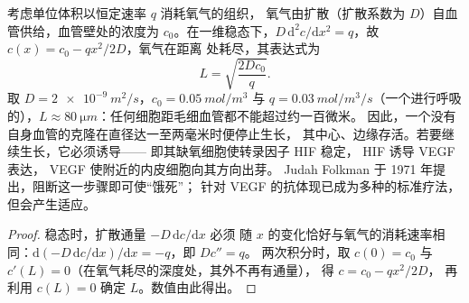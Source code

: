 \begin{proposition}[氧气决定无血管肿瘤的大小]\label{prop:b3:cancer-biology:oxygen}
考虑单位体积以恒定速率 $q$ 消耗氧气的组织，
氧气由扩散（扩散系数为 $D$）自血管供给，血管壁处的浓度为
$c_{0}$。在一维稳态下，$D\,
\mathrm{d}^{2}c/\mathrm{d}x^{2} = q$，故 $c(x) = c_{0} - qx^{2}/2D$，氧气在距离
处耗尽，其表达式为
\[
L = \sqrt{\frac{2Dc_{0}}{q}} .
\]
取 $D = \qty{2e-9}{m^2/s}$，$c_{0} = \qty{0.05}{mol/m^3}$ 与 $q =
\qty{0.03}{mol/m^3/s}$（一个进行呼吸的），$L \approx \qty{80}{\micro
m}$：任何细胞距毛细血管都不能超过约一百微米。
因此，一个没有自身血管的克隆在直径达一至两毫米时便停止生长，
其中心、边缘存活。若要继续生长，它必须诱导\emph{}——
即其缺氧细胞使转录因子 HIF 稳定，
HIF 诱导 VEGF 表达，
VEGF 使附近的内皮细胞向其方向出芽。
Judah Folkman 于 1971 年提出，阻断这一步骤即可使“饿死”；
针对 VEGF 的抗体现已成为多种的标准疗法，
但会产生适应。
\end{proposition}
\begin{proof}
稳态时，扩散通量 $-D\,\mathrm{d}c/\mathrm{d}x$ 必须
随 $x$ 的变化恰好与氧气的消耗速率相同：$\mathrm{d}(-D\,
\mathrm{d}c/\mathrm{d}x)/\mathrm{d}x = -q$，即 $D c'' = q$。
两次积分时，取 $c(0) = c_{0}$ 与 $c'(L) = 0$（在氧气耗尽的深度处，其外不再有通量），
得 $c = c_{0} - qx^{2}/2D$，
再利用 $c(L) = 0$ 确定 $L$。数值由此得出。
\end{proof}

